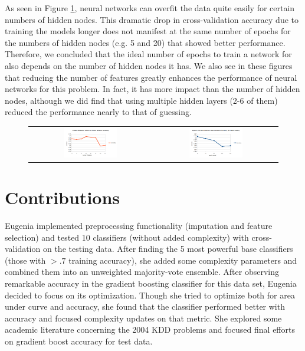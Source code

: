 \documentclass{article}
\begin{document}
As seen in Figure \ref{nn_figs}, neural networks can overfit the data quite easily for certain numbers of hidden nodes.
This dramatic drop in cross-validation accuracy due to training the models longer does not manifest at the same number of epochs for the numbers of hidden nodes (e.g. 5 and 20) that showed better performance.
Therefore, we concluded that the ideal number of epochs to train a network for also depends on the number of hidden nodes it has.
We also see in these figures that reducing the number of features greatly enhances the performance of neural networks for this problem.
In fact, it has more impact than the number of hidden nodes, although we did find that using multiple hidden layers (2-6 of them) reduced the performance nearly to that of guessing.

\begin{figure}[!h]
\centering
\begin{tabular}{cc}
\includegraphics[width=0.45\textwidth]{nn_features} &
\includegraphics[width=0.45\textwidth]{nn_epochs}
\end{tabular}
\label{nn_figs}
\end{figure}


\section{Contributions}

Eugenia implemented preprocessing functionality (imputation and feature selection) and tested 10 classifiers (without added complexity) with cross-validation on the testing data. 
After finding the 5 most powerful base classifiers (those with $> .7$ training accuracy), she added some complexity parameters and combined them into an unweighted majority-vote ensemble. 
After observing remarkable accuracy in the gradient boosting classifier for this data set, Eugenia decided to focus on its optimization.
Though she tried to optimize both for area under curve and accuracy, she found that the classifier performed better with accuracy and focused complexity updates on that metric.
She explored some academic literature concerning the 2004 KDD problems and focused final efforts on gradient boost accuracy for test data.
\end{document}

